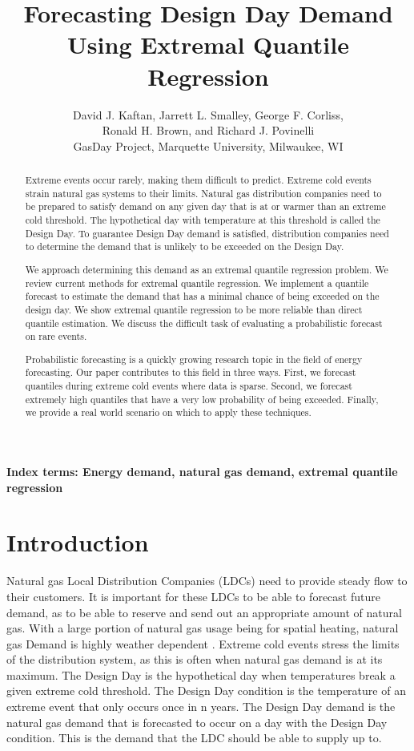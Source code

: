 \documentclass{article}
\title{Forecasting Design Day Demand Using Extremal Quantile Regression}
\author{David J. Kaftan, Jarrett L. Smalley, George F. Corliss, \\
Ronald H. Brown, and Richard J. Povinelli \\
GasDay Project, Marquette University, Milwaukee, WI
}
\date{}
\begin{document}
\maketitle

\begin{abstract}
Extreme events occur rarely, making them difficult to predict. Extreme cold events strain natural gas systems to their limits. Natural gas distribution companies need to be prepared to satisfy demand on any given day that is at or warmer than an extreme cold threshold. The hypothetical day with temperature at this threshold is called the Design Day. To guarantee Design Day demand is satisfied, distribution companies need to determine the demand that is unlikely to be exceeded on the Design Day.

We approach determining this demand as an extremal quantile regression problem. We review current methods for extremal quantile regression. We implement a quantile forecast to estimate the demand that has a minimal chance of being exceeded on the design day. We show extremal quantile regression to be more reliable than direct quantile estimation. We discuss the difficult task of evaluating a probabilistic forecast on rare events.

Probabilistic forecasting is a quickly growing research topic in the field of energy forecasting. Our paper contributes to this field in three ways. First, we forecast quantiles during extreme cold events where data is sparse. Second, we forecast extremely high quantiles that have a very low probability of being exceeded. Finally, we provide a real world scenario on which to apply these techniques.    
\end{abstract} 

{\bf Index terms: Energy demand, natural gas demand, extremal quantile regression}

\section{Introduction}
Natural gas Local Distribution Companies (LDCs) need to provide steady flow to their customers. It is important for these LDCs to be able to forecast future demand, as to be able to reserve and send out an appropriate amount of natural gas. With a large portion of natural gas usage being for spatial heating, natural gas Demand is highly weather dependent \cite{vitullo2009mathematical}. Extreme cold events stress the limits of the distribution system, as this is often when natural gas demand is at its maximum. The Design Day is the hypothetical day when temperatures break a given extreme cold threshold. The Design Day condition is the temperature of an extreme event that only occurs once in n years. The Design Day demand is the natural gas demand that is forecasted to occur on a day with the Design Day condition. This is the demand that the LDC should be able to supply up to. 
\end{document}
